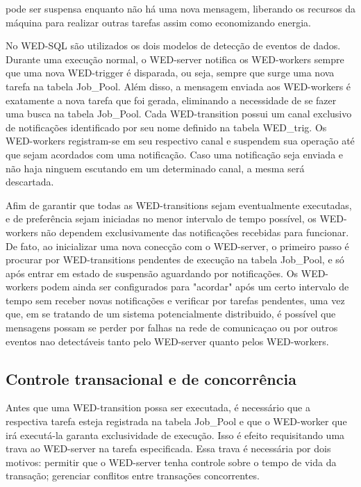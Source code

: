 \documentclass[conference]{IEEEtran}
\begin{document}
pode ser suspensa enquanto não há uma nova mensagem, liberando os recursos da máquina para realizar outras tarefas assim como economizando energia.
\par No WED-SQL são utilizados os dois modelos de detecção de eventos de dados. Durante uma execução normal, o WED-server notifica os WED-workers
sempre que uma nova WED-trigger é disparada, ou seja, sempre que surge uma nova tarefa na tabela Job\_Pool. Além disso, a mensagem enviada aos WED-workers
é exatamente a nova tarefa que foi gerada, eliminando a necessidade de se fazer uma busca na tabela Job\_Pool. Cada WED-transition possui um canal exclusivo
de notificações identificado por seu nome definido na tabela WED\_trig. Os WED-workers registram-se em seu respectivo canal e suspendem sua operação até
que sejam acordados com uma notificação. Caso uma notificação seja enviada e não haja ninguem escutando em um determinado canal, a mesma será descartada.
\par Afim de garantir que todas as WED-transitions sejam eventualmente executadas, e de preferência sejam iniciadas no menor intervalo de tempo possível, os
WED-workers não dependem exclusivamente das notificações recebidas para funcionar. De fato, ao inicializar uma nova conecção com o WED-server, o primeiro
passo é procurar por WED-transitions pendentes de execução na tabela Job\_Pool, e só após entrar em estado de suspensão aguardando por notificações. Os 
WED-workers podem ainda ser configurados para "acordar" após um certo intervalo de tempo sem receber novas notificações e verificar por tarefas pendentes,
uma vez que, em se tratando de um sistema potencialmente distribuido, é possível que mensagens possam se perder por falhas na rede de comunicaçao ou por
outros eventos nao detectáveis tanto pelo WED-server quanto pelos WED-workers. 




\subsection{Controle transacional e de concorrência}

Antes que uma WED-transition possa ser executada, é necessário que a respectiva tarefa esteja registrada na tabela Job\_Pool e que
o WED-worker que irá executá-la garanta exclusividade de execução. Isso é efeito requisitando uma trava ao WED-server na tarefa
especificada. Essa trava é necessária por dois motivos: permitir que o WED-server tenha controle sobre o tempo de vida da transação;
gerenciar conflitos entre transações concorrentes.
\end{document}

